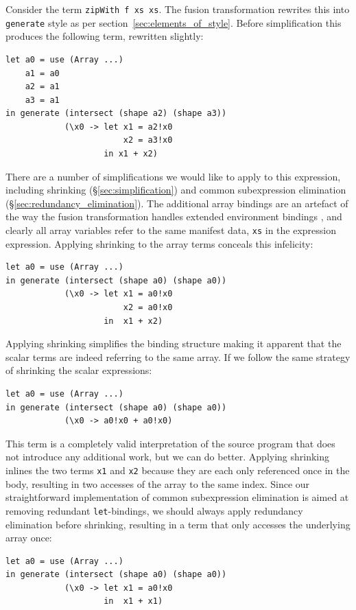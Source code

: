 Consider the term \lstinline[style=inline]{zipWith f xs xs}. The fusion
transformation rewrites this into \texttt{generate} style as per
section~\ref{sec:elements_of_style}. Before simplification this produces the
following term, rewritten slightly:
%
\begin{lstlisting}[style=haskell]
let a0 = use (Array ...)
    a1 = a0
    a2 = a1
    a3 = a1
in generate (intersect (shape a2) (shape a3))
            (\x0 -> let x1 = a2!x0
                        x2 = a3!x0
                    in x1 + x2)
\end{lstlisting}
%
There are a number of simplifications we would like to apply to this expression,
including shrinking (\S\ref{sec:simplification}) and common subexpression
elimination (\S\ref{sec:redundancy_elimination}). The additional array bindings
are an artefact of the way the fusion transformation handles extended
environment bindings ,
and clearly all array variables refer to the same manifest data, \texttt{xs} in
the expression expression. Applying shrinking to the array terms conceals this
infelicity:
%
\begin{lstlisting}[style=haskell]
let a0 = use (Array ...)
in generate (intersect (shape a0) (shape a0))
            (\x0 -> let x1 = a0!x0
                        x2 = a0!x0
                    in  x1 + x2)
\end{lstlisting}
%
Applying shrinking simplifies the binding structure making it apparent that the
scalar terms are indeed referring to the same array. If we follow the same
strategy of shrinking the scalar expressions:
%
\begin{lstlisting}[style=haskell]
let a0 = use (Array ...)
in generate (intersect (shape a0) (shape a0))
            (\x0 -> a0!x0 + a0!x0)
\end{lstlisting}
%
This term is a completely valid interpretation of the source program that does
not introduce any additional work, but we can do better. Applying shrinking
inlines the two terms \texttt{x1} and \texttt{x2} because they are each only
referenced once in the body, resulting in two accesses of the array to the same
index. Since our straightforward implementation of common subexpression
elimination is aimed at removing redundant \texttt{let}-bindings, we should
always apply redundancy elimination before shrinking, resulting in a term that
only accesses the underlying array once:
%
\begin{lstlisting}[style=haskell]
let a0 = use (Array ...)
in generate (intersect (shape a0) (shape a0))
            (\x0 -> let x1 = a0!x0
                    in  x1 + x1)
\end{lstlisting}

